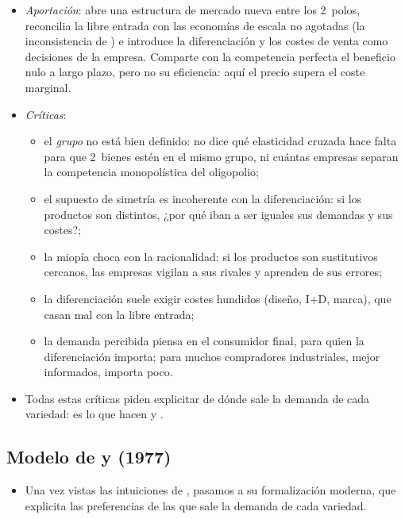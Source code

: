 \documentclass[11pt]{article}
\begin{document}
\begin{itemize}
\item \emph{Aportación}: abre una estructura de mercado nueva entre los 2~polos, reconcilia la libre entrada con las economías de escala no agotadas (la inconsistencia de ) e introduce la diferenciación y los costes de venta como decisiones de la empresa. Comparte con la competencia perfecta el beneficio nulo a largo plazo, pero no su eficiencia: aquí el precio supera el coste marginal.
\item \emph{Críticas}:
  \begin{itemize}
  \item el \emph{grupo} no está bien definido: no dice qué elasticidad cruzada hace falta para que 2~bienes estén en el mismo grupo, ni cuántas empresas separan la competencia monopolística del oligopolio\nocite{Stigler1949Monopolistic};
  \item el supuesto de simetría es incoherente con la diferenciación: si los productos son distintos, ¿por qué iban a ser iguales sus demandas y sus costes?\nocite{Kaldor1935Market};
  \item la miopía choca con la racionalidad: si los productos son sustitutivos cercanos, las empresas vigilan a sus rivales y aprenden de sus errores;
  \item la diferenciación suele exigir costes hundidos (diseño, I+D, marca), que casan mal con la libre entrada;
  \item la demanda percibida piensa en el consumidor final, para quien la diferenciación importa; para muchos compradores industriales, mejor informados, importa poco\nocite{Andrews1949Manufacturing}.
  \end{itemize}
\item Todas estas críticas piden explicitar de dónde sale la demanda de cada variedad: es lo que hacen  y .
\end{itemize}

\subsection{Modelo de  y  (1977)}\label{sec:dixit-stiglitz}

\begin{itemize}
\item Una vez vistas las intuiciones de , pasamos a su formalización moderna, que explicita las preferencias de las que sale la demanda de cada variedad.
\end{itemize}
\end{document}
